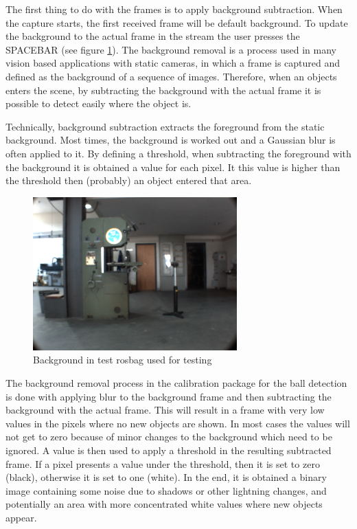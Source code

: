 The first thing to do with the frames is to apply background subtraction. When the capture starts, the first received frame will be default background. To update the background to the actual frame in the stream the user presses the SPACEBAR (see figure \ref{fig:background}). The background removal is a process used in many vision based applications with static cameras, in which a frame is captured and defined as the background of a sequence of images. Therefore, when an objects enters the scene, by subtracting the background with the actual frame it is possible to detect easily where the object is. \cite{OpenCV}

Technically, background subtraction extracts the foreground from the static background. Most times, the background is worked out and a Gaussian blur is often applied to it. By defining a threshold, when subtracting the foreground with the background it is obtained a value for each pixel. It this value is higher than the threshold then (probably) an object entered that area.

\begin{figure}[htp]
	
	\centering
	\includegraphics[width=0.7\textwidth]{capcalib/imgs/background.png}
	
	\caption{Background in test rosbag used for testing}
	\label{fig:background}
	
\end{figure}

The background removal process in the calibration package for the ball detection is done with applying blur to the background frame and then subtracting the background with the actual frame. This will result in a frame with very low values in the pixels where no new objects are shown. In most cases the values will not get to zero because of minor changes to the background which need to be ignored. A value is then used to apply a threshold in the resulting subtracted frame. If a pixel presents a value under the threshold, then it is set to zero (black), otherwise it is set to one (white). In the end, it is obtained a binary image containing some noise due to shadows or other lightning changes, and potentially an area with more concentrated white values where new objects appear. 


